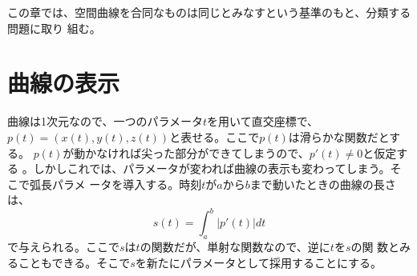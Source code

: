     この章では、空間曲線を合同なものは同じとみなすという基準のもと、分類する問題に取り
    組む。
    \section{曲線の表示}
        曲線は1次元なので、一つのパラメータ$t$を用いて直交座標で、
        $p(t)=(x(t),y(t),z(t))$と表せる。ここで$p(t)$は滑らかな関数だとする。
        $p(t)$が動かなければ尖った部分ができてしまうので、$p'(t)\neq 0$と仮定する
        。しかしこれでは、パラメータが変われば曲線の表示も変わってしまう。そこで弧長パラメ
        ータを導入する。時刻$t$が$a$から$b$まで動いたときの曲線の長さは、
            \[s(t) = \int_a^b |p'(t)|dt\]
        で与えられる。ここで$s$は$t$の関数だが、単射な関数なので、逆に$t$を$s$の関
        数とみることもできる。そこで$s$を新たにパラメータとして採用することにする。


